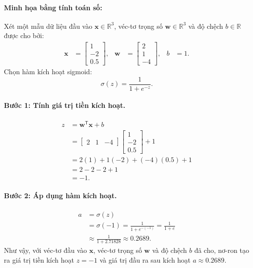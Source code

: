 \paragraph{Minh họa bằng tính toán số:\\}
Xét một mẫu dữ liệu đầu vào $\mathbf{x}\in\mathbb{R}^3$, véc-tơ trọng số $\mathbf{w}\in\mathbb{R}^3$ và độ chệch $b\in\mathbb{R}$ được cho bởi:
$$\begin{aligned}
    \mathbf{x} &= \begin{bmatrix} 1 \\ -2 \\ 0.5 \end{bmatrix}, &
    \mathbf{w} &= \begin{bmatrix} 2 \\ 1 \\ -4 \end{bmatrix}, &
    b &= 1.
\end{aligned}$$
Chọn hàm kích hoạt sigmoid: $$\sigma(z)=\frac{1}{1+e^{-z}}.$$

\paragraph{Bước 1: Tính giá trị tiền kích hoạt.\\}
$$\begin{aligned}
    z &=\mathbf{w}^{\mathsf T}\mathbf{x}+b\\
    &= \begin{bmatrix}
        2&1&-4
        \end{bmatrix}
    \begin{bmatrix}
        1\\
        -2\\
        0.5
    \end{bmatrix}
    +1\\
    &=2(1)+1(-2)+(-4)(0.5)+1\\
    &=2-2-2+1\\
    &=-1.
\end{aligned}$$

\paragraph{Bước 2: Áp dụng hàm kích hoạt.}
$$\begin{aligned}
    a
    &=\sigma(z)\\
    &=\sigma(-1)=\frac{1}{1+e^{-(-1)}}=\frac{1}{1+e}\\
    &\approx\frac{1}{1+2.71828}\approx0.2689.
\end{aligned}$$
Như vậy, với véc-tơ đầu vào $\mathbf{x}$, véc-tơ trọng số $\mathbf{w}$ và độ chệch $b$ đã cho, nơ-ron tạo ra giá trị tiền kích hoạt $z=-1$ và giá trị đầu ra sau kích hoạt $a\approx0.2689$.

